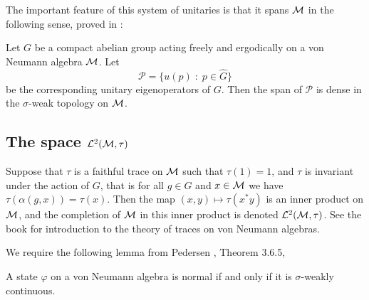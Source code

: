 The important feature of this system of unitaries is that it spans
$\mathcal{M}$ in the following sense, proved in \cite[Thm 2.3]{Pedersen1979}:
\begin{proposition}
\label{densePolynomials}
    Let $G$ be a compact abelian group acting freely and ergodically 
    on a von Neumann algebra $\mathcal{M}$. Let
    \begin{equation}
        \mathcal{P} = \{ u(p)\;:\; p \in \widehat{G}\}
    \end{equation}
    be the corresponding unitary eigenoperators of $G$. Then the span
    of $\mathcal{P}$ is dense in the $\sigma$-weak topology on $\mathcal{M}$.
\end{proposition}

\subsection{The space $\mathcal{L}^2(\mathcal{M},\tau)$}
Suppose that $\tau$ is a faithful trace on $\mathcal{M}$ such that $\tau(1) = 1$,
and $\tau$ is invariant under the action of $G$, that is for
all $g \in G$ and $x \in \mathcal{M}$ we have $\tau(\alpha(g,x)) = \tau(x)$. 
Then the map $(x,y)\mapsto \tau(x^*y)$ is an inner product on $\mathcal{M}$,
and the completion of $\mathcal{M}$ in this inner product is denoted $\mathcal{L}^2(\mathcal{M},\tau)$.
See the book \cite[Ch. 1]{SingularTraces} for introduction
to the theory of traces on von Neumann algebras.


We require the following lemma from Pedersen \cite{Pedersen1979},
Theorem 3.6.5,
\begin{lemma}
\label{pedersenLemma}
    A state $\varphi$ on a von Neumann algebra is normal if and only if it is
    $\sigma$-weakly continuous.
\end{lemma}


